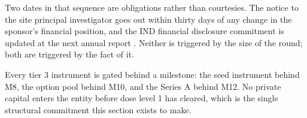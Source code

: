 Two dates in that sequence are obligations rather than courtesies. The notice to
the site principal investigator goes out within thirty days of any change in the
sponsor's financial position, and the IND financial disclosure commitment is
updated at the next annual report \cite{ecfr2026part312}. Neither is triggered
by the size of the round; both are triggered by the fact of it.

Every tier 3 instrument is gated behind a milestone: the seed instrument behind
M8, the option pool behind M10, and the Series A behind M12. No private capital
enters the entity before dose level 1 has cleared, which is the single
structural commitment this section exists to make.
